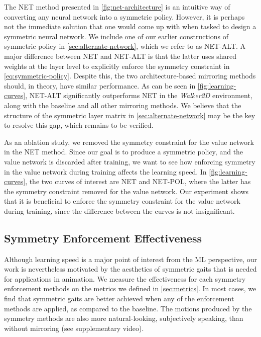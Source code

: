   The NET method presented in \autoref{fig:net-architecture} is 
an intuitive way of converting any neural network into a symmetric policy.  
However, it is perhaps not the immediate solution that one would come up with when tasked to design a symmetric neural network.  
We include one of our earlier constructions of symmetric policy in \autoref{sec:alternate-network}, 
which we refer to as NET-ALT.  A major difference between NET and NET-ALT is that the latter uses 
shared weights at the layer level to explicitly enforce the symmetry constraint in \autoref{eq:symmetric-policy}.  
Despite this, the two architecture-based mirroring methods should, in theory, have similar performance.  
As can be seen in \autoref{fig:learning-curves}, NET-ALT significantly outperforms NET in the \textit{Walker2D} environment, 
along with the baseline and all other mirroring methods.  
We believe that the structure of the symmetric layer matrix in \autoref{sec:alternate-network} 
may be the key to resolve this gap, which remains to be verified.

  As an ablation study, we removed the symmetry constraint 
for the value network in the NET method.  Since our goal is to produce a symmetric policy, 
and the value network is discarded after training, we want to see how enforcing symmetry in the value network 
during training affects the learning speed.  In \autoref{fig:learning-curves}, the two curves of interest are 
NET and NET-POL, where the latter has the symmetry constraint removed for the value network.  
Our experiment shows that it is beneficial to enforce the symmetry constraint for the value network during training, 
since the difference between the curves is not insignificant.  

\subsection{Symmetry Enforcement Effectiveness}

Although learning speed is a major point of interest from the ML perspective, 
our work is nevertheless motivated by the aesthetics of symmetric gaits that is needed for applications in animation.  
We measure the effectiveness for each symmetry enforcement methods on the metrics we defined in \autoref{sec:metrics}.  
In most cases, we find that symmetric gaits are better achieved when any of the enforcement methods are applied, 
as compared to the baseline.  The motions produced by the symmetry methods are also more 
natural-looking, subjectively speaking, than without mirroring (see supplementary video). 

